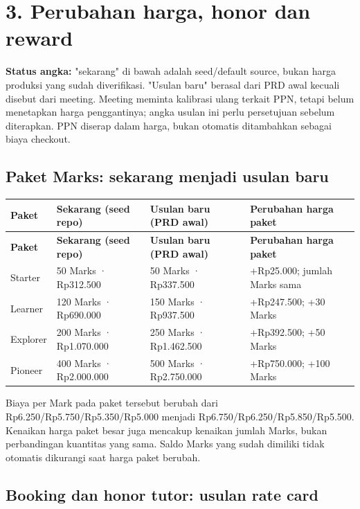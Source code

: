 \documentclass[10pt,a4paper]{article}
\begin{document}
\section*{3. Perubahan harga, honor dan reward}

\textbf{Status angka:} "sekarang" di bawah adalah seed/\allowbreak{}default source, bukan harga produksi yang sudah diverifikasi. "Usulan baru" berasal dari PRD awal kecuali disebut dari meeting. Meeting meminta kalibrasi ulang terkait PPN, tetapi belum menetapkan harga penggantinya; angka usulan ini perlu persetujuan sebelum diterapkan. PPN diserap dalam harga, bukan otomatis ditambahkan sebagai biaya checkout.

\subsection*{Paket Marks: sekarang  menjadi  usulan baru}

{\small
\begin{longtable}{L{25.40mm}L{44.45mm}L{44.45mm}L{44.45mm}}
\hline
\textbf{Paket} & \textbf{Sekarang (seed repo)} & \textbf{Usulan baru (PRD awal)} & \textbf{Perubahan harga paket} \\ \hline
\endfirsthead
\hline
\textbf{Paket} & \textbf{Sekarang (seed repo)} & \textbf{Usulan baru (PRD awal)} & \textbf{Perubahan harga paket} \\ \hline
\endhead
Starter & 50 Marks · Rp312.500 & 50 Marks · Rp337.500 & +Rp25.000; jumlah Marks sama \\ \hline
Learner & 120 Marks · Rp690.000 & 150 Marks · Rp937.500 & +Rp247.500; +30 Marks \\ \hline
Explorer & 200 Marks · Rp1.070.000 & 250 Marks · Rp1.462.500 & +Rp392.500; +50 Marks \\ \hline
Pioneer & 400 Marks · Rp2.000.000 & 500 Marks · Rp2.750.000 & +Rp750.000; +100 Marks \\ \hline
\end{longtable}
}

Biaya per Mark pada paket tersebut berubah dari Rp6.250/\allowbreak{}Rp5.750/\allowbreak{}Rp5.350/\allowbreak{}Rp5.000 menjadi Rp6.750/\allowbreak{}Rp6.250/\allowbreak{}Rp5.850/\allowbreak{}Rp5.500. Kenaikan harga paket besar juga mencakup kenaikan jumlah Marks, bukan perbandingan kuantitas yang sama. Saldo Marks yang sudah dimiliki tidak otomatis dikurangi saat harga paket berubah.


\newpage
\subsection*{Booking dan honor tutor: usulan rate card}
\end{document}
